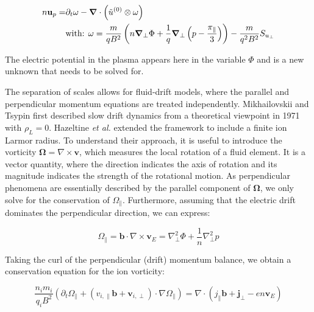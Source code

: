 \begin{align}
	n\mathbf{u}_{p} =& \partial_t\mathbf{\omega} - \grad\cdot\left(\tilde{u}^{(0)}\otimes\mathbf{\omega}\right) \nonumber \\
	&\text{with: } \mathbf{\omega} = \frac{m}{qB^2}\left(n\grad_\perp\Phi + \frac{1}{q}\grad_{\perp}\left(p-\frac{\pi_\parallel}{3}\right)\right) - \frac{m}{q^2B^2}S_{u_\perp} \label{eq:definitionSmallOmega}
\end{align}

The electric potential in the plasma appears here in the variable $\Phi$ and is a new unknown that needs to be solved for.






The separation of scales allows for fluid-drift models, where the parallel and perpendicular momentum equations are treated independently. Mikhailovskii and Tsypin\cite{mikhailovskii1971transport} first described slow drift dynamics from a theoretical viewpoint in 1971 with $\rho_L = 0$. Hazeltine \emph{et al.}\cite{hazeltine1985four} extended the framework to include a finite ion Larmor radius. To understand their approach, it is useful to introduce the vorticity $ \boldsymbol{\Omega} = \nabla \times \mathbf{v}$, which measures the local rotation of a fluid element. It is a vector quantity, where the direction indicates the axis of rotation and its magnitude indicates the strength of the rotational motion. As perpendicular phenomena are essentially described by the parallel component of $\boldsymbol{\Omega}$, we only solve for the conservation of $\Omega_\parallel$. Furthermore, assuming that the electric drift dominates the perpendicular direction, we can express:

\begin{equation}
	\Omega_\parallel = \mathbf{b} \cdot \nabla \times \mathbf{v}_E = \nabla_\perp^2 \Phi + \frac{1}{n}\nabla_\perp^2 p
\end{equation}

Taking the curl of the perpendicular (drift) momentum balance, we obtain a conservation equation for the ion vorticity:

\begin{equation}
	\label{eq:edge_vorticityConservation}
	\frac{n_im_i}{q_iB^2}\left(\partial_t\Omega_\parallel + (v_{i,\parallel}\mathbf{b} + \mathbf{v}_{i,\perp})\cdot\nabla\Omega_\parallel\right) = \nabla \cdot \left(j_\parallel\mathbf{b} + \mathbf{j}_\perp - en\mathbf{v}_E\right)
\end{equation}

